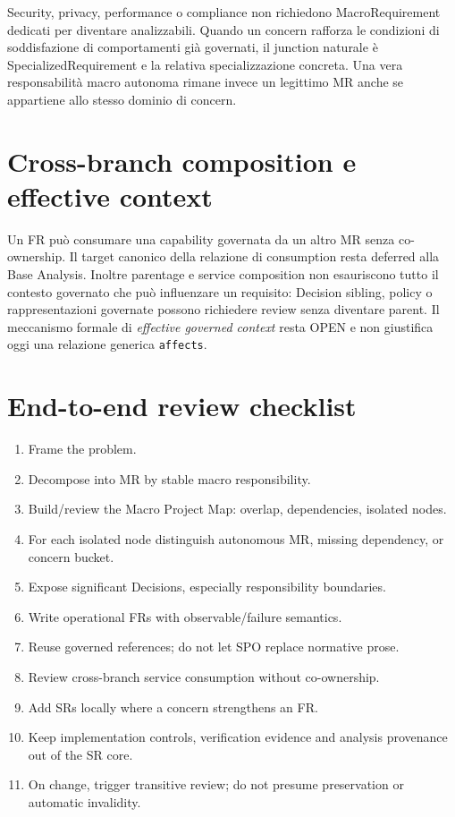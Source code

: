 \documentclass[11pt,a4paper]{article}
\begin{document}
\begin{candidatebox}
Security, privacy, performance o compliance non richiedono MacroRequirement dedicati per diventare analizzabili. Quando un concern rafforza le condizioni di soddisfazione di comportamenti già governati, il junction naturale è SpecializedRequirement e la relativa specializzazione concreta. Una vera responsabilità macro autonoma rimane invece un legittimo MR anche se appartiene allo stesso dominio di concern.
\end{candidatebox}

\section{Cross-branch composition e effective context}
Un FR può consumare una capability governata da un altro MR senza co-ownership. Il target canonico della relazione di consumption resta deferred alla Base Analysis. Inoltre parentage e service composition non esauriscono tutto il contesto governato che può influenzare un requisito: Decision sibling, policy o rappresentazioni governate possono richiedere review senza diventare parent. Il meccanismo formale di \emph{effective governed context} resta OPEN e non giustifica oggi una relazione generica \texttt{affects}.

\section{End-to-end review checklist}
\begin{enumerate}
\item Frame the problem.
\item Decompose into MR by stable macro responsibility.
\item Build/review the Macro Project Map: overlap, dependencies, isolated nodes.
\item For each isolated node distinguish autonomous MR, missing dependency, or concern bucket.
\item Expose significant Decisions, especially responsibility boundaries.
\item Write operational FRs with observable/failure semantics.
\item Reuse governed references; do not let SPO replace normative prose.
\item Review cross-branch service consumption without co-ownership.
\item Add SRs locally where a concern strengthens an FR.
\item Keep implementation controls, verification evidence and analysis provenance out of the SR core.
\item On change, trigger transitive review; do not presume preservation or automatic invalidity.
\end{enumerate}
\end{document}
